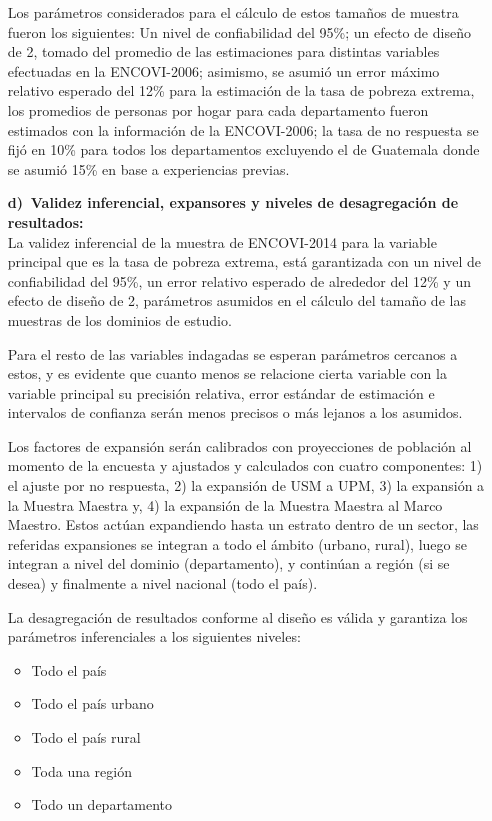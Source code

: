 \begin{itemize}
	
	
	Los parámetros  considerados para el cálculo de estos tamaños de muestra fueron los siguientes: Un nivel de confiabilidad del 95\%; un efecto de diseño de 2, tomado del promedio de las estimaciones para distintas variables efectuadas en la ENCOVI-2006; asimismo, se asumió un error máximo relativo esperado del 12\% para la estimación de la tasa de pobreza extrema, los promedios de personas por hogar para cada departamento fueron estimados con la información de la ENCOVI-2006; la tasa de no respuesta se fijó en 10\% para todos los departamentos excluyendo el de Guatemala donde se asumió 15\% en base a experiencias previas.
	
		
	
	\item[\large\textbf{d)}$\ $]	\textbf{\large Validez inferencial, expansores y niveles de desagregación de resultados:} \\[3mm]	
	
	La validez inferencial de la muestra de ENCOVI-2014 para la variable principal que es la tasa de pobreza extrema, está garantizada con un nivel de confiabilidad del 95\%, un error relativo esperado de alrededor del 12\% y un efecto de diseño de 2, parámetros asumidos en el cálculo del tamaño de las muestras de los dominios de estudio. 
	
	Para el resto de las variables indagadas se esperan parámetros cercanos  a estos, y es evidente que  cuanto menos se relacione cierta variable con la variable principal su precisión relativa, error estándar de estimación e intervalos de confianza serán  menos precisos o más lejanos a los asumidos. 
	
	Los factores de expansión serán calibrados con proyecciones de población al momento de la encuesta y ajustados y calculados con cuatro componentes: 1) el ajuste por no respuesta, 2) la expansión de USM a UPM, 3) la expansión a la Muestra Maestra y, 4) la expansión de la Muestra Maestra al Marco Maestro. Estos actúan expandiendo hasta un estrato dentro de un sector, las referidas expansiones se integran a todo el ámbito (urbano, rural), luego se integran a nivel del dominio (departamento), y continúan a región (si se desea) y finalmente a nivel nacional (todo el país).
	
	La desagregación de resultados conforme al diseño es válida y garantiza los parámetros inferenciales a los siguientes niveles:
	
	
	\begin{itemize}
		\item Todo el país
		\item Todo el país urbano
		\item Todo el país rural
		\item Toda una región
		\item Todo un departamento 
		

\end{itemize}
\end{itemize}
